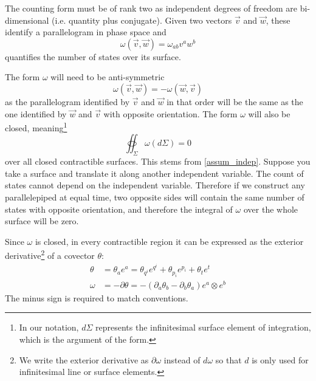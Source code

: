 \documentclass[10pt,twocolumn, nofootinbib]{revtex4-2}
\begin{document}
The counting form must be of rank two as independent degrees of freedom are bi-dimensional (i.e. quantity plus conjugate). Given two vectors $\vec{v}$ and $\vec{w}$, these identify a parallelogram in phase space and 
\begin{equation}\label{mdof_form_applied}
	\omega(\vec{v}, \vec{w}) = \omega_{ab} v^a w^b
\end{equation}
quantifies the number of states over its surface.

The form $\omega$ will need to be anti-symmetric
\begin{equation}\label{mdof_form_antisymm}
	\omega(\vec{v}, \vec{w}) = - \omega(\vec{w}, \vec{v})
\end{equation}
as the parallelogram identified by $\vec{v}$ and $\vec{w}$ in that order will be the same as the one identified by $\vec{w}$ and $\vec{v}$ with opposite orientation. The form $\omega$ will also be closed, meaning\footnote{In our notation, $d\Sigma$ represents the infinitesimal surface element of integration, which is the argument of the form.}
\begin{equation}\label{mdof_closed_form}
	\oiint_\Sigma \omega(d\Sigma) = 0
\end{equation}
over all closed contractible surfaces. This stems from \ref{assum_indep}. Suppose you take a surface and translate it along another independent variable. The count of states cannot depend on the independent variable. Therefore if we construct any parallelepiped at equal time, two opposite sides will contain the same number of states with opposite orientation, and therefore the integral of $\omega$ over the whole surface will be zero.

Since $\omega$ is closed, in every contractible region it can be expressed as the exterior derivative\footnote{We write the exterior derivative as $\partial \omega$ instead of $d \omega$ so that $d$ is only used for infinitesimal line or surface elements.} of a covector $\theta$:
\begin{equation}\label{mdof_form_potential}
	\begin{aligned}
		\theta &= \theta_a e^a = \theta_{q^i} e^{q^i} + \theta_{p_i} e^{p_i} + \theta_t e^t \\
		\omega &= - \partial \theta = - \left( \partial_a \theta_b - \partial_b \theta_a \right) e^a \otimes e^b
	\end{aligned}
\end{equation}
The minus sign is required to match conventions.
\end{document}
